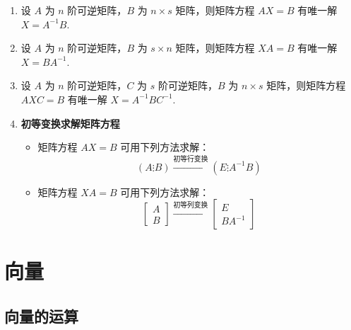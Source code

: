 \documentclass[UTF8]{ctexart}
\theoremstyle{mydef}
\begin{document}
\begin{enumerate}
    \item 设 $A$ 为 $n$ 阶可逆矩阵，$B$ 为 $n \times s$ 矩阵，则矩阵方程 $AX = B$ 有唯一解 $X = A^{-1}B$.
    \item 设 $A$ 为 $n$ 阶可逆矩阵，$B$ 为 $s \times n$ 矩阵，则矩阵方程 $XA = B$ 有唯一解 $X = BA^{-1}$.
    \item 设 $A$ 为 $n$ 阶可逆矩阵，$C$ 为 $s$ 阶可逆矩阵，$B$ 为 $n \times s$ 矩阵，则矩阵方程 $AXC = B$ 有唯一解 $X = A^{-1}BC^{-1}$.
    \item \textbf{初等变换求解矩阵方程}
    \begin{itemize}
        \item 矩阵方程 $AX = B$ 可用下列方法求解：
        $$ (A \vdots B) \xrightarrow{\text{初等行变换}} (E \vdots A^{-1}B) $$
        \item 矩阵方程 $XA = B$ 可用下列方法求解：
        $$ \begin{bmatrix} A \\ B \end{bmatrix} \xrightarrow{\text{初等列变换}} \begin{bmatrix} E \\ BA^{-1} \end{bmatrix} $$
    \end{itemize}
\end{enumerate}


\newpage
\section{向量}

\subsection{向量的运算}
\end{document}
